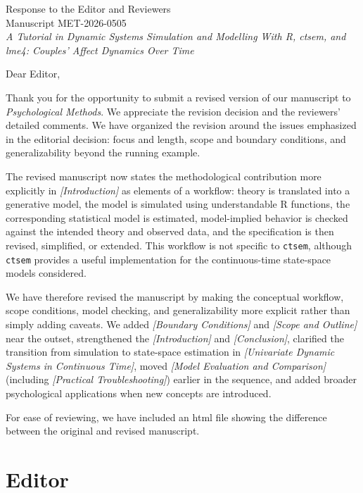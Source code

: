 \documentclass[11pt]{article}
\newcommand{\ms}{\textit{A Tutorial in Dynamic Systems Simulation and Modelling With R, ctsem, and lme4: Couples' Affect Dynamics Over Time}}
\newcommand{\secit}[1]{\textit{[#1]}}
\begin{document}
\begin{center}
{\Large Response to the Editor and Reviewers}\\
\vspace{0.5em}
Manuscript MET-2026-0505\\
\ms
\end{center}
Dear Editor,

Thank you for the opportunity to submit a revised version of our manuscript to \textit{Psychological Methods}.
We appreciate the revision decision and the reviewers' detailed comments.
We have organized the revision around the issues emphasized in the editorial decision: focus and length, scope and boundary conditions, and generalizability beyond the running example.

The revised manuscript now states the methodological contribution more explicitly in \secit{Introduction} as elements of a workflow: theory is translated into a generative model, the model is simulated using understandable R functions, the corresponding statistical model is estimated, model-implied behavior is checked against the intended theory and observed data, and the specification is then revised, simplified, or extended.
This workflow is not specific to \texttt{ctsem}, although \texttt{ctsem} provides a useful implementation for the continuous-time state-space models considered.

We have therefore revised the manuscript by making the conceptual workflow, scope conditions, model checking, and generalizability more explicit rather than simply adding caveats.
We added \secit{Boundary Conditions} and \secit{Scope and Outline} near the outset, strengthened the \secit{Introduction} and \secit{Conclusion}, clarified the transition from simulation to state-space estimation in \secit{Univariate Dynamic Systems in Continuous Time}, moved \secit{Model Evaluation and Comparison} (including \secit{Practical Troubleshooting}) earlier in the sequence, and added broader psychological applications when new concepts are introduced.

For ease of reviewing, we have included an html file showing the difference between the original and revised manuscript. 
\section*{Editor}
\end{document}
